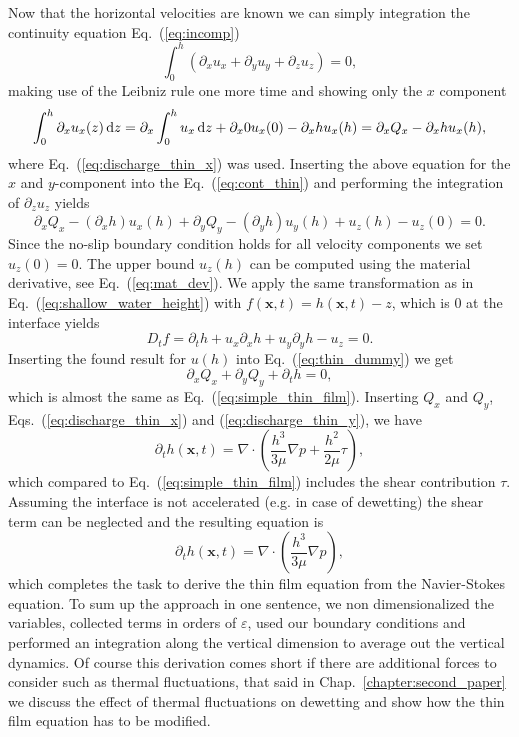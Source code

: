 Now that the horizontal velocities are known we can simply integration the continuity equation Eq.~(\ref{eq:incomp})
\begin{equation}\label{eq:cont_thin}
    \int_0^h(\partial_x u_x + \partial_y u_y + \partial_z u_z) = 0,
\end{equation}
making use of the Leibniz rule one more time and showing only the $x$ component
\begin{equation}
    \int_0^h \partial_x u_x(z) \mathop{}\!\mathrm{d} z = \partial_x\int_0^h u_x\mathop{}\!\mathrm{d} z + \partial_x 0 u_x(0) - \partial_x h u_x(h) = \partial_x Q_x - \partial_x h u_x(h),  
\end{equation}
where Eq.~(\ref{eq:discharge_thin_x}) was used.
Inserting the above equation for the $x$ and $y$-component into the Eq.~(\ref{eq:cont_thin}) and performing the integration of $\partial_z u_z$ yields
\begin{equation}\label{eq:thin_dummy}
    \partial_x Q_x - (\partial_x h) u_x(h) + \partial_y Q_y - (\partial_y h) u_y(h) + u_z(h) - u_z(0) = 0.
\end{equation}
Since the no-slip boundary condition holds for all velocity components we set $u_z(0) = 0$.
The upper bound $u_z(h)$ can be computed using the material derivative, see Eq.~(\ref{eq:mat_dev}). 
We apply the same transformation as in Eq.~(\ref{eq:shallow_water_height}) with $f(\mathbf{x},t) = h(\mathbf{x},t) - z$, which is $0$ at the interface yields
\begin{equation}\label{eq:mat_uz_h}
    D_t f = \partial_t h + u_x\partial_x h + u_y\partial_y h - u_z = 0.
\end{equation}
Inserting the found result for $u(h)$ into Eq.~(\ref{eq:thin_dummy}) we get
\begin{equation}\label{eq:thin_obsc}
    \partial_x Q_x + \partial_y Q_y + \partial_t h = 0,
\end{equation}
which is almost the same as Eq.~(\ref{eq:simple_thin_film}).
Inserting $Q_x$ and $Q_y$, Eqs.~(\ref{eq:discharge_thin_x}) and (\ref{eq:discharge_thin_y}), we have
\begin{equation}
    \partial_t h(\mathbf{x},t) = \nabla\cdot\left(\frac{h^3}{3\mu}\nabla p + \frac{h^2}{2\mu}\tau\right),
\end{equation}
which compared to Eq.~(\ref{eq:simple_thin_film}) includes the shear contribution $\tau$.
Assuming the interface is not accelerated (e.g. in case of dewetting) the shear term can be neglected and the resulting equation is 
\begin{equation}\label{eq:thin_final}
    \partial_t h(\mathbf{x},t) = \nabla\cdot\left(\frac{h^3}{3\mu}\nabla p\right),
\end{equation}
which completes the task to derive the thin film equation from the Navier-Stokes equation. 
To sum up the approach in one sentence, we non dimensionalized the variables, collected terms in orders of $\varepsilon$, used our boundary conditions and performed an integration along the vertical dimension to average out the vertical dynamics.
Of course this derivation comes short if there are additional forces to consider such as thermal fluctuations, that said in Chap.~\ref{chapter:second_paper} we discuss the effect of thermal fluctuations on dewetting and show how the thin film equation has to be modified.

